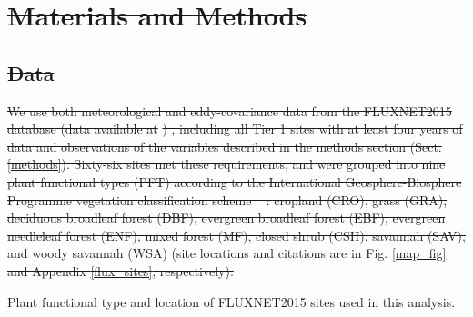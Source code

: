 \documentclass[hess, manuscript]{copernicus}
\providecommand{\DIFdeltex}[1]{{\protect\color{red}\sout{#1}}}                      %
\providecommand{\DIFdelFL}[1]{\DIFdel{#1}} %
\providecommand{\DIFdel}[1]{\texorpdfstring{\DIFdeltex{#1}}{}} %
\begin{document}
\section{\DIFdel{Materials and Methods}}
\addtocounter{section}{-1}%
\subsection{\DIFdel{Data}}
\addtocounter{subsection}{-1}%
\DIFdel{We use both meteorological and eddy-covariance data from the FLUXNET2015
database (data available at }%
\DIFdel{)
,
including all Tier 1 sites with at least four years of data and
observations of the variables described in the
methods section (Sect.
\ref{methods}). Sixty-six sites met these requirements, and were grouped
into nine plant functional types (PFT) according to the International
Geosphere-Biosphere Programme vegetation classification scheme
\mbox{%
\citep{Loveland_1999}}%
: cropland (CRO), grass (GRA), deciduous broadleaf
forest (DBF), evergreen broadleaf forest (EBF), evergreen needleleaf
forest (ENF), mixed forest (MF), closed shrub (CSH), savannah (SAV), and
woody savannah (WSA) (site locations and citations are in Fig.
\ref{map_fig} and Appendix \ref{flux_sites}, respectively). }%

{%
\DIFdelFL{Plant functional type and location of FLUXNET2015 sites
    used in this analysis.}}
\end{document}
